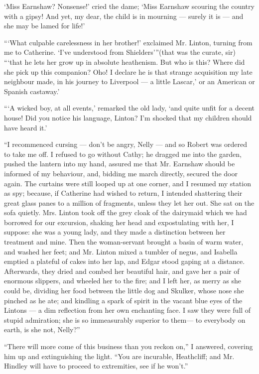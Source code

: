 \par ‘Miss Earnshaw? Nonsense!’ cried the dame; ‘Miss Earnshaw scouring the country with a gipsy! And yet, my dear, the child is in mourning — surely it is — and she may be lamed for life!’
\par “‘What culpable carelessness in her brother!’ exclaimed Mr. Linton, turning from me to Catherine. ‘I've understood from Shielders’”(that was the curate, sir) “‘that he lets her grow up in absolute heathenism. But who is this? Where did she pick up this companion? Oho! I declare he is that strange acquisition my late neighbour made, in his journey to Liverpool — a little Lascar,’ or an American or Spanish castaway.’
\par “‘A wicked boy, at all events,’ remarked the old lady, ‘and quite unfit for a decent house! Did you notice his language, Linton? I'm shocked that my children should have heard it.’
\par “I recommenced cursing — don't be angry, Nelly — and so Robert was ordered to take me off. I refused to go without Cathy; he dragged me into the garden, pushed the lantern into my hand, assured me that Mr. Earnshaw should be informed of my behaviour, and, bidding me march directly, secured the door again. The curtains were still looped up at one corner, and I resumed my station as spy; because, if Catherine had wished to return, I intended shattering their great glass panes to a million of fragments, unless they let her out. She sat on the sofa quietly. Mrs. Linton took off the grey cloak of the dairymaid which we had borrowed for our excursion, shaking her head and expostulating with her, I suppose: she was a young lady, and they made a distinction between her treatment and mine. Then the woman-servant brought a basin of warm water, and washed her feet; and Mr. Linton mixed a tumbler of negus, and Isabella emptied a plateful of cakes into her lap, and Edgar stood gaping at a distance. Afterwards, they dried and combed her beautiful hair, and gave her a pair of enormous slippers, and wheeled her to the fire; and I left her, as merry as she could be, dividing her food between the little dog and Skulker, whose nose she pinched as he ate; and kindling a spark of spirit in the vacant blue eyes of the Lintons — a dim reflection from her own enchanting face. I saw they were full of stupid admiration; she is so immeasurably superior to them— to everybody on earth, is she not, Nelly?”
\par “There will more come of this business than you reckon on,” I answered, covering him up and extinguishing the light. “You are incurable, Heathcliff; and Mr. Hindley will have to proceed to extremities, see if he won't.”
